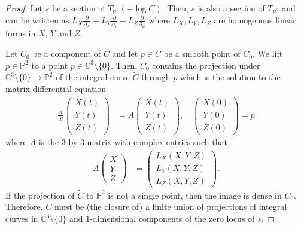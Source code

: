 \documentclass[11pt,reqno]{amsart}
\theoremstyle{plain}
\theoremstyle{definition}
\theoremstyle{remark}
\numberwithin{equation}{section}
\renewcommand{\to}{{\longrightarrow}}
\numberwithin{equation}{section}
\newcommand{\PP}{\mathbb{P}}
\begin{document}
\begin{proof}
Let $s$ be a section of $T_{\PP^2}(-\log C)$.  Then, $s$ is also a section of $T_{\PP^2}$ and can be written as $L_X\frac{\partial}{\partial_X}+L_Y\frac{\partial}{\partial_Y}+L_Z\frac{\partial}{\partial_Z}$ where $L_X, L_Y, L_Z$ are homogenous linear forms in $X$, $Y$ and $Z$.

Let $C_0$ be a component of $C$ and let $p\in C$ be a smooth point of $C_0$.  We lift $p\in \mathbb{P}^2$ to a point $\widetilde{p}\in \mathbb{C}^3 \setminus \{0\}$.
Then, $C_0$ contains the projection under $\mathbb{C}^3\setminus\{0\}\to \mathbb{P}^2$ of the integral curve $\widetilde{C}$ through $\widetilde{p}$ which is the solution to the matrix differential equation
\begin{align}
\label{21b}
    \frac{d}{dt} \begin{pmatrix} X(t) \\ Y(t) \\ Z(t)\end{pmatrix} &= A \begin{pmatrix} X(t) \\ Y(t) \\ Z(t)\end{pmatrix},\quad \begin{pmatrix} X(0) \\ Y(0) \\ Z(0)\end{pmatrix} =\widetilde{p}
\end{align}
 where $A$ is the 3 by 3 matrix with complex entries such that
\begin{align*}
    A\begin{pmatrix} X \\ Y \\ Z\end{pmatrix} &=\begin{pmatrix} L_X(X,Y,Z) \\L_Y(X,Y,Z)\\ L_Z(X,Y,Z)\end{pmatrix}.
\end{align*}
 If the projection of $\widetilde{C}$ to $\mathbb{P}^2$ is not a single point, then the image is dense in $C_0$. Therefore, $C$ must be (the closure of) a finite union of projections of integral curves in $\mathbb{C}^3 \setminus \{0\}$ and 1-dimensional components of the zero locus of $s$.


\end{proof}
\end{document}
